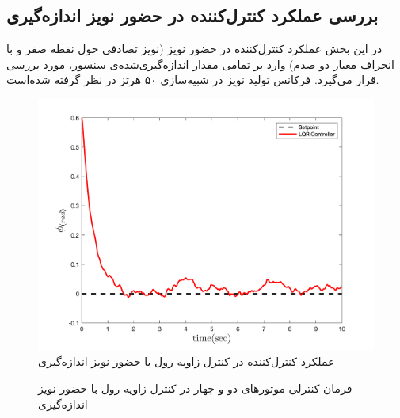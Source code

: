 \subsection{بررسی عملكرد کنترل‌کننده در حضور نويز اندازه‌گیری}\label{roll_noise}

در این بخش عملکرد کنترل‌کننده در حضور نویز (نویز تصادفی حول نقطه صفر و با انحراف معیار دو صدم) وارد بر تمامی مقدار  اندازه‌گیری‌شده‌ی سنسور، مورد بررسی قرار می‌گیرد. فرکانس تولید نویز در شبیه‌سازی ۵۰ هرتز در نظر گرفته شده‌است.
\begin{figure}[H]
	\includegraphics[width=.48\linewidth]{../Figures/MIL/LQR/Roll/lqr_roll.png}
	\centering
	\caption{عملكرد کنترل‌کننده   در کنترل زاويه رول با حضور نويز اندازه‌گیری}
	\label{lqr_roll_figure_simulation_n}
\end{figure}
\begin{figure}[H]
	\centering
	\caption{‫‪فرمان کنترلی موتورهای دو و چهار در کنترل زاویه رول با حضور نويز اندازه‌گیری}
\end{figure}


